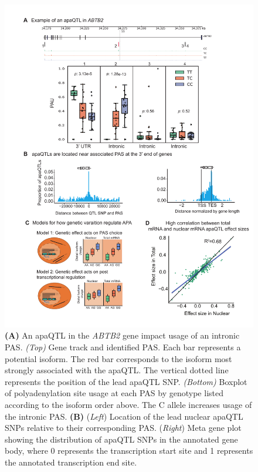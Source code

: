 \begin{figure}
\centering \includegraphics[width=5in]{img/ch02/figure2.pdf}
\caption[Identify genetic variation driving differences in polyadenylation as apaQTLs]{\small {\bf (A)} An apaQTL in the {\it ABTB2} gene impact usage of an intronic PAS. {\it (Top)} Gene track and identified PAS. Each bar represents a potential isoform. The red bar corresponds to the isoform most strongly associated with the apaQTL. The vertical dotted line represents the position of the lead apaQTL SNP. {\it (Bottom)} Boxplot of polyadenylation site usage at each PAS by genotype listed according to the isoform order above. The C allele increases usage of the intronic PAS. {\bf (B)} ({\it Left})  Location of the lead nuclear apaQTL SNPs relative to their corresponding PAS. ({\it Right}) Meta gene plot showing the distribution of apaQTL SNPs in the annotated gene body, where 0 represents the transcription start site and 1 represents the annotated transcription end site.} 
\label{fig:qtlFigure}
\end{figure}


